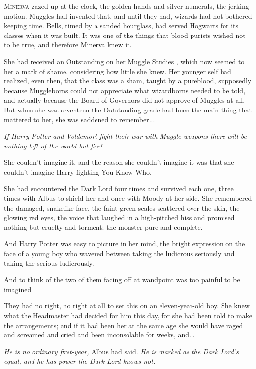 
\lettrine{M}{inerva} gazed up at the clock, the golden hands and silver numerals, the jerking motion. Muggles had invented that, and until they had, wizards had not bothered keeping time. Bells, timed by a sanded hourglass, had served Hogwarts for its classes when it was built. It was one of the things that blood purists wished not to be true, and therefore Minerva knew it.

She had received an Outstanding on her Muggle Studies , which now seemed to her a mark of shame, considering how little she knew. Her younger self had realized, even then, that the class was a sham, taught by a pureblood, supposedly because Muggleborns could not appreciate what wizardborns needed to be told, and actually because the Board of Governors did not approve of Muggles at all. But when she was seventeen the Outstanding grade had been the main thing that mattered to her, she was saddened to remember...

\emph{If Harry Potter and Voldemort fight their war with Muggle weapons there will be nothing left of the world but fire!}

She couldn’t imagine it, and the reason she couldn’t imagine it was that she couldn’t imagine Harry fighting You-Know-Who.

She had encountered the Dark Lord four times and survived each one, three times with Albus to shield her and once with Moody at her side. She remembered the damaged, snakelike face, the faint green scales scattered over the skin, the glowing red eyes, the voice that laughed in a high-pitched hiss and promised nothing but cruelty and torment: the monster pure and complete.

And Harry Potter was easy to picture in her mind, the bright expression on the face of a young boy who wavered between taking the ludicrous seriously and taking the serious ludicrously.

And to think of the two of them facing off at wandpoint was too painful to be imagined.

They had no right, no right at all to set this on an eleven-year-old boy. She knew what the Headmaster had decided for him this day, for she had been told to make the arrangements; and if it had been her at the same age she would have raged and screamed and cried and been inconsolable for weeks, and...

\emph{He is no ordinary first-year,} Albus had said. \emph{He is marked as the Dark Lord’s equal, and he has power the Dark Lord knows not.}

